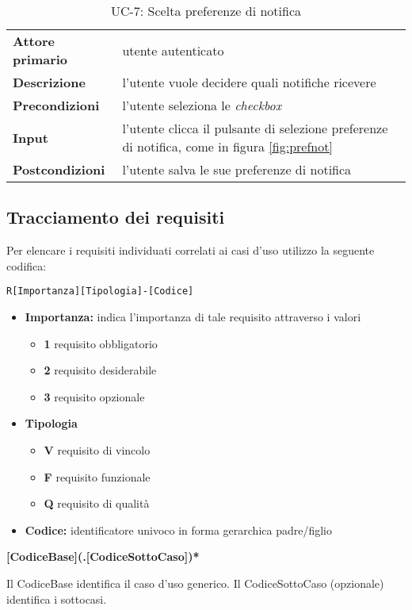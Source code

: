 \begin{table}[H]
    \centering
    \begin{tabular}{|p{3cm}p{11.15cm}|}
        \hline
        \textbf{Attore primario} & utente autenticato \\
        \textbf{Descrizione} & l’utente vuole decidere quali notifiche ricevere \\
        \textbf{Precondizioni} & l’utente seleziona le \textit{checkbox} \\
        \textbf{Input} & l’utente clicca il pulsante di selezione preferenze di notifica, come in figura \ref{fig:prefnot} \\
        \textbf{Postcondizioni} & l’utente salva le sue preferenze di notifica \\\hline
    \end{tabular}
    \caption{UC-7: Scelta preferenze di notifica}
\end{table}

\subsection{Tracciamento dei requisiti}
Per elencare i requisiti individuati correlati ai casi d'uso utilizzo la seguente codifica:
\begin{center}
    \texttt{R[Importanza][Tipologia]-[Codice]}
\end{center}
\begin{itemize}
    \item \textbf{Importanza:} indica l'importanza di tale requisito attraverso i valori
    \begin{itemize}
        \item \textbf{1} requisito obbligatorio
        \item \textbf{2} requisito desiderabile
        \item \textbf{3} requisito opzionale
    \end{itemize}
    \item \textbf{Tipologia}
    \begin{itemize}
        \item \textbf{V} requisito di vincolo
        \item \textbf{F} requisito funzionale
        \item \textbf{Q} requisito di qualità
    \end{itemize}
    \item \textbf{Codice:} identificatore univoco in forma gerarchica padre/figlio
\end{itemize}
\begin{center}
    \textbf{[CodiceBase](.[CodiceSottoCaso])*}
\end{center}
Il CodiceBase identifica il caso d'uso generico. Il CodiceSottoCaso (opzionale) identifica i sottocasi.

